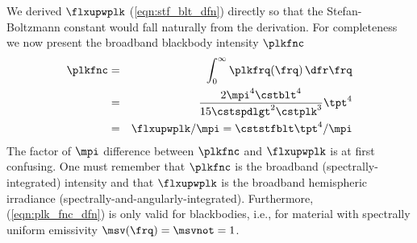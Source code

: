 \documentclass[12pt]{article}
\begin{document}
We derived $\flxupwplk$ (\ref{eqn:stf_blt_dfn}) directly so that
the Stefan-Boltzmann constant would fall naturally from the
derivation. 
For completeness we now present the broadband blackbody intensity
$\plkfnc$
\begin{eqnarray}
\plkfnc & = & \int_{0}^{\infty} \plkfrq(\frq) \,\dfr\frq \nonumber \\
& = & \frac{2 \mpi^{4} \cstblt^{4}}{15 \cstspdlgt^{2} \cstplk^{3}} \tpt^{4} \nonumber \\
& = & \flxupwplk / \mpi = \cststfblt \tpt^{4} / \mpi 
\label{eqn:plk_fnc_dfn}
\end{eqnarray}
The factor of $\mpi$ difference between $\plkfnc$ and $\flxupwplk$ 
is at first confusing.
One must remember that $\plkfnc$ is the broadband
(spectrally-integrated) intensity and that $\flxupwplk$ is the 
broadband hemispheric irradiance
(spectrally-and-angularly-integrated).  
Furthermore, (\ref{eqn:plk_fnc_dfn}) is only valid for blackbodies, i.e., for material with spectrally uniform emissivity $\msv(\frq) = \msvnot = 1$.
\end{document}

